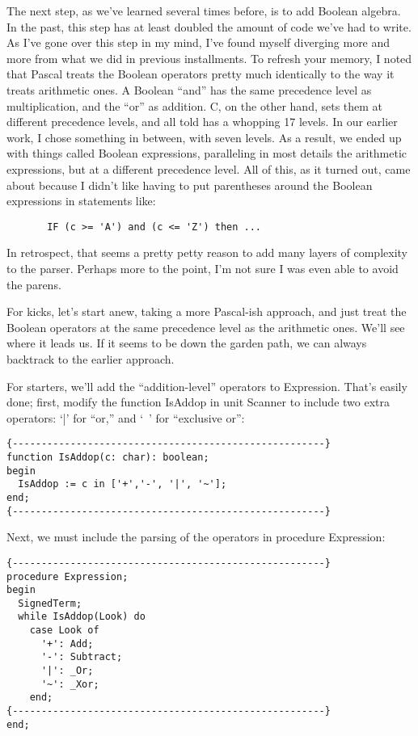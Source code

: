 The next step, as we've learned several times before, is to add Boolean algebra. In the past, this step has at least doubled the amount of code we've had to write. As I've gone over this step in my mind, I've found myself diverging more and more from what we did in previous installments. To refresh your memory, I noted that Pascal treats the Boolean operators pretty much identically to the way it treats arithmetic ones. A Boolean ``and'' has the same precedence level as multiplication, and the ``or'' as addition. C, on the other hand, sets them at different precedence levels, and all told has a whopping 17 levels. In our earlier work, I chose something in between, with seven levels. As a result, we ended up with things called Boolean expressions, paralleling in most details the arithmetic expressions, but at a different precedence level. All of this, as it turned out, came about because I didn't like having to put parentheses around the Boolean expressions in statements like:

\begin{verbatim}
       IF (c >= 'A') and (c <= 'Z') then ...
\end{verbatim}

In retrospect, that seems a pretty petty reason to add many layers of complexity to the parser. Perhaps more to the point, I'm not sure I was even able to avoid the parens.

For kicks, let's start anew, taking a more Pascal-ish approach, and just treat the Boolean operators at the same precedence level as the arithmetic ones. We'll see where it leads us. If it seems to be down the garden path, we can always backtrack to the earlier approach.

For starters, we'll add the ``addition-level'' operators to Expression. That's easily done; first, modify the function IsAddop in unit Scanner to include two extra operators: `|' for ``or,'' and `~' for ``exclusive or'':

\begin{verbatim}
{------------------------------------------------------}
function IsAddop(c: char): boolean;
begin
  IsAddop := c in ['+','-', '|', '~'];
end;
{------------------------------------------------------}
\end{verbatim}

Next, we must include the parsing of the operators in procedure Expression:

\begin{verbatim}
{------------------------------------------------------}
procedure Expression;
begin
  SignedTerm;
  while IsAddop(Look) do
    case Look of
      '+': Add;
      '-': Subtract;
      '|': _Or;
      '~': _Xor;
    end;
{------------------------------------------------------}
end;
\end{verbatim}

